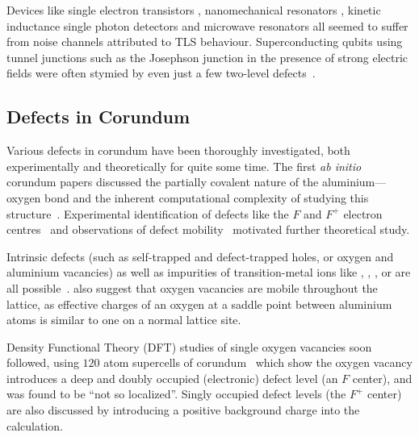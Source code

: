 Devices like single electron transistors \cite{Zimmerli1992}, nanomechanical resonators \cite{Ahn2003}, kinetic inductance single photon detectors and microwave resonators \cite{Gao2007} all seemed to suffer from noise channels attributed to TLS behaviour.
Superconducting qubits using tunnel junctions such as the Josephson junction in the presence of strong electric fields were often stymied by even just a few two-level defects~\cite{Simmonds2004}.

\subsection{Defects in Corundum}\label{sec:cordef}
Various defects in corundum have been thoroughly investigated, both experimentally and theoretically for quite some time.
The first \emph{ab initio} corundum papers discussed the partially covalent nature of the aluminium---oxygen bond and the inherent computational complexity of studying this structure~\cite{Causa1987}.
Experimental identification of defects like the $F$
and $F^+$ electron centres~\cite{Kotomin1989} and observations of defect mobility~\cite{Kulis1991} motivated further theoretical study.

Intrinsic defects (such as self-trapped and defect-trapped holes, or oxygen and aluminium vacancies) as well as impurities of transition-metal ions like , , ,  or  are all possible~\cite{Jacobs1994}.
\citeauthor{Jacobs1994} also suggest that oxygen vacancies are mobile throughout the lattice, as effective charges of an oxygen at a saddle point between aluminium atoms is similar to one on a normal lattice site.

Density Functional Theory (DFT) studies of single oxygen vacancies soon followed, using $120$ atom supercells of corundum~\cite{Xu1997} which show the oxygen vacancy introduces a deep and doubly occupied (electronic) defect level (an $F$ center), and was found to be ``not so localized''.
Singly occupied defect levels (the $F^+$ center) are also discussed by introducing a positive background charge into the calculation.

